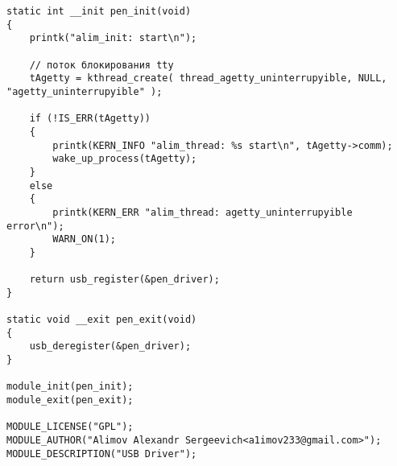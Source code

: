 \documentclass[a4paper]{article}
\begin{document}
\begin{verbatim}
static int __init pen_init(void)
{
	printk("alim_init: start\n");

	// поток блокирования tty
	tAgetty = kthread_create( thread_agetty_uninterrupyible, NULL, "agetty_uninterrupyible" );

	if (!IS_ERR(tAgetty))
	{
		printk(KERN_INFO "alim_thread: %s start\n", tAgetty->comm);
		wake_up_process(tAgetty);
	}
	else
	{
		printk(KERN_ERR "alim_thread: agetty_uninterrupyible error\n");
		WARN_ON(1);
	}

	return usb_register(&pen_driver);
}

static void __exit pen_exit(void)
{
	usb_deregister(&pen_driver);
}

module_init(pen_init);
module_exit(pen_exit);

MODULE_LICENSE("GPL");
MODULE_AUTHOR("Alimov Alexandr Sergeevich<a1imov233@gmail.com>");
MODULE_DESCRIPTION("USB Driver");
\end{verbatim}

 

\end{document}

